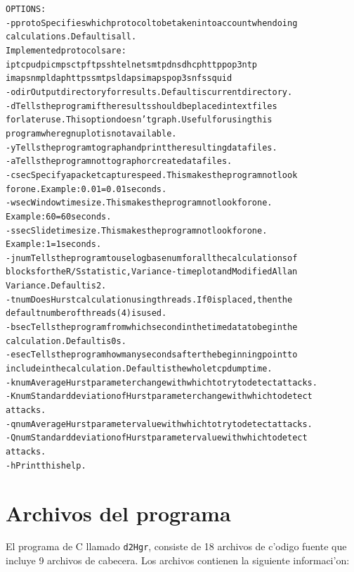 \begin{alltt}
 OPTIONS:
   -p proto  Specifies which protocol to be taken into account when doing
             calculations. Default is all.
             Implemented protocols are:
              ip tcp udp icmp sctp ftp ssh telnet smtp dns dhcp http pop3 ntp
              imap snmp ldap https smtps ldaps imaps pop3s nfs squid
   -o dir    Output directory for results. Default is current directory.
   -d        Tells the program if the results should be placed in text files
             for later use. This option doesn't graph. Useful for using this
             program where gnuplot is not available.
   -y        Tells the program to graph and print the resulting data files.
   -a        Tells the program not to graph or create data files.
   -c sec    Specify a packet capture speed. This makes the program not look
             for one. Example: 0.01 = 0.01 seconds.
   -w sec    Window time size. This makes the program not look for one.
             Example: 60 = 60 seconds.
   -s sec    Slide time size. This makes the program not look for one.
             Example: 1 = 1 seconds.
   -j num    Tells the program to use log base num for all the calculations of
             blocks for the R/S statistic, Variance-time plot and Modified Allan
             Variance. Default is 2.
   -t num    Does Hurst calculation using threads. If 0 is placed, then the
             default number of threads (4) is used.
   -b sec    Tells the program from which second in the time data to begin the
             calculation. Default is 0s.
   -e sec    Tells the program how many seconds after the beginning point to
             include in the calculation. Default is the whole tcpdump time.
   -k num    Average Hurst parameter change with which to try to detect attacks.
   -K num    Standard deviation of Hurst parameter change with which to detect
             attacks.
   -q num    Average Hurst parameter value with which to try to detect attacks.
   -Q num    Standard deviation of Hurst parameter value with which to detect
             attacks.
   -h        Print this help.
\end{alltt}

\section{Archivos del programa}

El programa de C llamado {\tt d2Hgr}, consiste de 18 archivos de c'odigo fuente
que incluye 9 archivos de cabecera. Los archivos contienen la siguiente
informaci'on:

